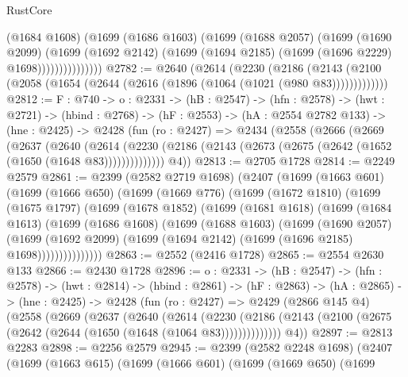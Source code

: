 \begin{lexlean}{RustCore}
\begin{coremodule}
                      (@1684 @1608)
                      (@1699
                        (@1686 @1603)
                        (@1699
                          (@1688 @2057)
                          (@1699
                            (@1690 @2099)
                            (@1699
                              (@1692 @2142)
                              (@1699 (@1694 @2185) (@1699 (@1696 @2229) @1698)))))))))))))))
@2782 := @2640
    (@2614
      (@2230
        (@2186 (@2143 (@2100 (@2058 (@1654 (@2644 (@2616 (@1896 (@1064 (@1021 (@980 @83)))))))))))))
@2812 := {F : @740} ->
  {o : @2331} ->
  (hB : @2547) ->
  (hfn : @2578) ->
  (hwt : @2721) ->
  (hbind : @2768) ->
  (hF : @2553) ->
  (hA : @2554 @2782 @133) ->
  (hne : @2425) ->
  @2428
    (fun (ro : @2427) =>
    @2434
      (@2558
        (@2666
          (@2669
            (@2637
              (@2640
                (@2614
                  (@2230 (@2186 (@2143 (@2673 (@2675 (@2642 (@1652 (@1650 (@1648 @83))))))))))))))
        @4))
@2813 := @2705 @1728
@2814 := @2249 @2579
@2861 := @2399
    (@2582 @2719 @1698)
    (@2407
      (@1699
        (@1663 @601)
        (@1699
          (@1666 @650)
          (@1699
            (@1669 @776)
            (@1699
              (@1672 @1810)
              (@1699
                (@1675 @1797)
                (@1699
                  (@1678 @1852)
                  (@1699
                    (@1681 @1618)
                    (@1699
                      (@1684 @1613)
                      (@1699
                        (@1686 @1608)
                        (@1699
                          (@1688 @1603)
                          (@1699
                            (@1690 @2057)
                            (@1699
                              (@1692 @2099)
                              (@1699 (@1694 @2142) (@1699 (@1696 @2185) @1698)))))))))))))))
@2863 := @2552 (@2416 @1728)
@2865 := @2554 @2630 @133
@2866 := @2430 @1728
@2896 := {o : @2331} ->
  (hB : @2547) ->
  (hfn : @2578) ->
  (hwt : @2814) ->
  (hbind : @2861) ->
  (hF : @2863) ->
  (hA : @2865) ->
  (hne : @2425) ->
  @2428
    (fun (ro : @2427) =>
    @2429
      (@2866 @145 @4)
      (@2558
        (@2669
          (@2637
            (@2640
              (@2614
                (@2230
                  (@2186 (@2143 (@2100 (@2675 (@2642 (@2644 (@1650 (@1648 (@1064 @83))))))))))))))
        @4))
@2897 := @2813 @2283
@2898 := @2256 @2579
@2945 := @2399
    (@2582 @2248 @1698)
    (@2407
      (@1699
        (@1663 @615)
        (@1699
          (@1666 @601)
          (@1699
            (@1669 @650)
            (@1699

\end{coremodule}
\end{lexlean}
